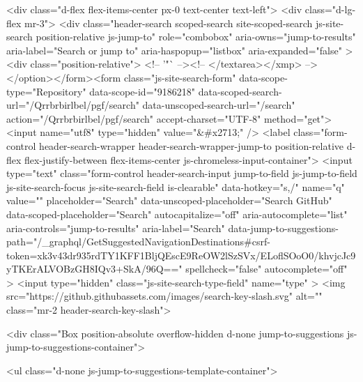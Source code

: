       <div class="d-flex flex-items-center px-0 text-center text-left">
          <div class="d-lg-flex mr-3">
            <div class="header-search scoped-search site-scoped-search js-site-search position-relative js-jump-to"
  role="combobox"
  aria-owns="jump-to-results"
  aria-label="Search or jump to"
  aria-haspopup="listbox"
  aria-expanded="false"
>
  <div class="position-relative">
    <!-- '"` --><!-- </textarea></xmp> --></option></form><form class="js-site-search-form" data-scope-type="Repository" data-scope-id="9186218" data-scoped-search-url="/Qrrbrbirlbel/pgf/search" data-unscoped-search-url="/search" action="/Qrrbrbirlbel/pgf/search" accept-charset="UTF-8" method="get"><input name="utf8" type="hidden" value="&#x2713;" />
      <label class="form-control header-search-wrapper header-search-wrapper-jump-to position-relative d-flex flex-justify-between flex-items-center js-chromeless-input-container">
        <input type="text"
          class="form-control header-search-input jump-to-field js-jump-to-field js-site-search-focus js-site-search-field is-clearable"
          data-hotkey="s,/"
          name="q"
          value=""
          placeholder="Search"
          data-unscoped-placeholder="Search GitHub"
          data-scoped-placeholder="Search"
          autocapitalize="off"
          aria-autocomplete="list"
          aria-controls="jump-to-results"
          aria-label="Search"
          data-jump-to-suggestions-path="/_graphql/GetSuggestedNavigationDestinations#csrf-token=xk3v43dr935rdTY1KFF1BljQEscE9ReOW2lSzSVx/ELoflSOoO0/khvjcJc9yTKErALVOBzGH8IQv3+SkA/96Q=="
          spellcheck="false"
          autocomplete="off"
          >
          <input type="hidden" class="js-site-search-type-field" name="type" >
            <img src="https://github.githubassets.com/images/search-key-slash.svg" alt="" class="mr-2 header-search-key-slash">

            <div class="Box position-absolute overflow-hidden d-none jump-to-suggestions js-jump-to-suggestions-container">
              
<ul class="d-none js-jump-to-suggestions-template-container">
  


